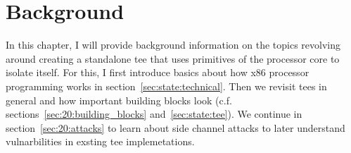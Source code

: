 \chapter{Background}
\label{sec:state}






In this chapter, I will provide background information on the topics revolving
around creating a standalone \gls{tee} that uses primitives of the processor
core to isolate itself. For this, I first introduce basics about how x86
processor programming works in section~\ref{sec:state:technical}. Then we
revisit \glspl{tee} in general and how important building blocks look (c.f.
sections~\ref{sec:20:building_blocks} and~\ref{sec:state:tee}). We continue in
section~\ref{sec:20:attacks} to learn about side channel attacks to later
understand vulnarbilities in exsting \gls{tee} implemetations.





